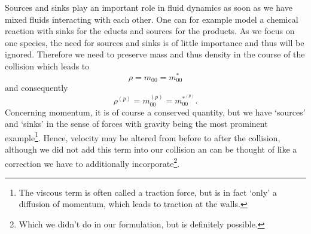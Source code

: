 Sources and sinks play an important role in fluid dynamics as soon as we have mixed fluids interacting with each other.
One can for example model a chemical reaction with sinks for the educts and sources for the products.
As we focus on one species, the need for sources and sinks is of little importance and thus will be ignored.
Therefore we need to preserve mass and thus density in the course of the collision which leads to
\begin{equation}
    \rho  = m_{00} = m_{00}^*
\end{equation}
and consequently
\begin{equation}
    \rho^{(p)} = m_{00}^{(p)} = m_{00}^{*^{(p)}}.
\end{equation}
Concerning momentum, it is of course a conserved quantity, but we have `sources' and `sinks' in the sense of forces with gravity being the most prominent example\footnote{The viscous term is often called a traction force, but is in fact `only' a diffusion of momentum, which leads to traction at the walls.}.
Hence, velocity may be altered from before to after the collision, although we did not add this term into our collision an can be thought of like a correction we have to additionally incorporate\footnote{Which we didn't do in our formulation, but is definitely possible.}.
